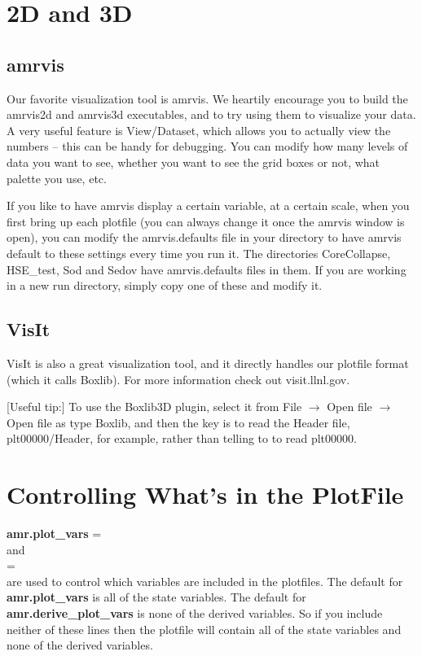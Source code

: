 \section{2D and 3D}
\subsection{amrvis}
Our favorite visualization tool is amrvis. We heartily encourage you to build the amrvis2d and amrvis3d executables, and to try using them to visualize your data. A very useful feature is View/Dataset, which allows you to actually view the numbers -- this can be handy for debugging. You can modify how many levels of data you want to see, whether you want to see the grid boxes or not, what palette you use, etc.

If you like to have amrvis display a certain variable, at a certain scale, when you first bring up each plotfile (you can always change it once the amrvis window is open), you can modify the amrvis.defaults file in your directory to have amrvis default to these settings every time you run it. The directories CoreCollapse, HSE\_test, Sod and Sedov have amrvis.defaults files in them. If you are working in a new run directory, simply copy one of these and modify it.
\subsection{VisIt}
VisIt is also a great visualization tool, and it directly handles our plotfile format (which it calls Boxlib).  For more information check out visit.llnl.gov.

[Useful tip:] To use the Boxlib3D plugin, select it from File $\rightarrow$ Open file $\rightarrow$ Open file as type Boxlib, and then the key is to read the Header file, plt00000/Header, for example, rather than telling to to read plt00000.

\section{Controlling What's in the PlotFile}

{\bf amr.plot\_vars} = \\

\noindent and  \\

 = \\

\noindent are used to control which variables are included in the plotfiles.  The default for {\bf amr.plot\_vars}
is all of the state variables.  The default for {\bf amr.derive\_plot\_vars} is none of
the derived variables.  So if you include neither of these lines then the plotfile
will contain all of the state variables and none of the derived variables. \\

